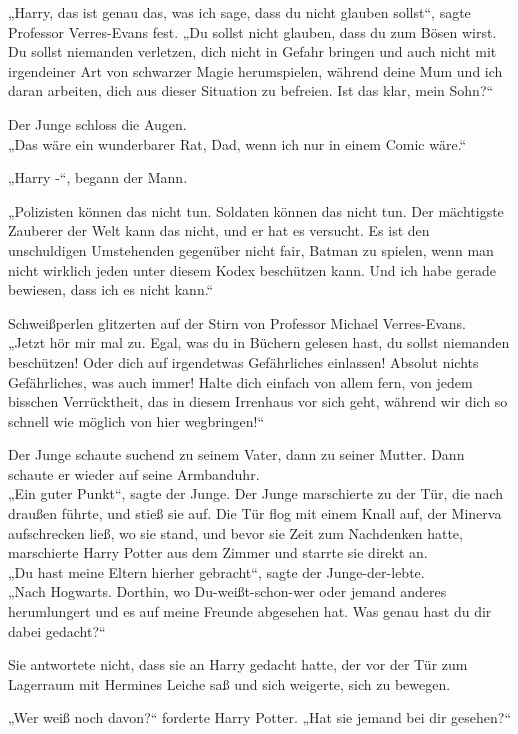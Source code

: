 {„Harry, das ist genau das, was ich sage, dass du nicht glauben sollst“, sagte Professor Verres-Evans fest. „Du sollst nicht glauben, dass du zum Bösen wirst. Du sollst niemanden verletzen, dich nicht in Gefahr bringen und auch nicht mit irgendeiner Art von schwarzer Magie herumspielen, während deine Mum und ich daran arbeiten, dich aus dieser Situation zu befreien. Ist das klar, mein Sohn?“

Der Junge schloss die Augen.\\ „Das wäre ein wunderbarer Rat, Dad, wenn ich nur in einem Comic wäre.“

„Harry -“, begann der Mann.

„Polizisten können das nicht tun. Soldaten können das nicht tun. Der mächtigste Zauberer der Welt kann das nicht, und er hat es versucht. Es ist den unschuldigen Umstehenden gegenüber nicht fair, Batman zu spielen, wenn man nicht wirklich jeden unter diesem Kodex beschützen kann. Und ich habe gerade bewiesen, dass ich es nicht kann.“

Schweißperlen glitzerten auf der Stirn von Professor Michael Verres-Evans.\\ „Jetzt hör mir mal zu. Egal, was du in Büchern gelesen hast, du sollst niemanden beschützen! Oder dich auf irgendetwas Gefährliches einlassen! Absolut nichts Gefährliches, was auch immer! Halte dich einfach von allem fern, von jedem bisschen Verrücktheit, das in diesem Irrenhaus vor sich geht, während wir dich so schnell wie möglich von hier wegbringen!“

Der Junge schaute suchend zu seinem Vater, dann zu seiner Mutter. Dann schaute er wieder auf seine Armbanduhr.\\ „Ein guter Punkt“, sagte der Junge. Der Junge marschierte zu der Tür, die nach draußen führte, und stieß sie auf. Die Tür flog mit einem Knall auf, der Minerva aufschrecken ließ, wo sie stand, und bevor sie Zeit zum Nachdenken hatte, marschierte Harry Potter aus dem Zimmer und starrte sie direkt an.\\ „Du hast meine Eltern hierher gebracht“, sagte der Junge-der-lebte.\\ „Nach Hogwarts. Dorthin, wo Du-weißt-schon-wer oder jemand anderes herumlungert und es auf meine Freunde abgesehen hat. Was genau hast du dir dabei gedacht?“

Sie antwortete nicht, dass sie an Harry gedacht hatte, der vor der Tür zum Lagerraum mit Hermines Leiche saß und sich weigerte, sich zu bewegen.

„Wer weiß noch davon?“ forderte Harry Potter. „Hat sie jemand bei dir gesehen?“

}
